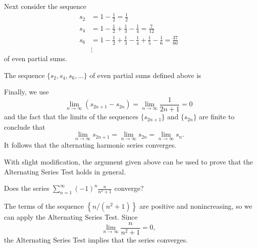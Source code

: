 \documentclass{ximera}
\begin{document}

Next consider the sequence
\begin{align*}
s_2 &= 1 - \frac{1}{2} = \frac{1}{2} \\
s_4 &= 1- \frac{1}{2} + \frac{1}{3} - \frac{1}{4} = \frac{7}{12} \\
s_6 &= 1 - \frac{1}{2} + \frac{1}{3} - \frac{1}{4} + \frac{1}{5} - \frac{1}{6} = \frac{37}{60} \\
&\vdots
\end{align*}
of even partial sums.

\begin{question}
The sequence $\{s_2,s_4,s_6,\ldots\}$ of even partial sums defined above is 
\begin{prompt}
        \begin{multipleChoice}
        \end{multipleChoice}
 \end{prompt}
 \end{question}
 
Finally, we use
$$
\lim_{n \rightarrow \infty} \left(s_{2n+1} - s_{2n} \right) = \lim_{n \rightarrow \infty} \frac{1}{2n+1} = 0
$$
and the fact that the limits of the sequences $\{s_{2n+1}\}$ and $\{s_{2n}\}$ are finite to conclude that
$$
\lim_{n \rightarrow \infty} s_{2n+1} = \lim_{n \rightarrow \infty} s_{2n} = \lim_{n\rightarrow \infty} s_n.
$$
It follows that the alternating harmonic series converges. 

With slight modification, the argument given above can be used to prove that the Alternating Series Test holds in general.


\begin{example}
Does the series $\sum_{n=1}^\infty (-1)^n\frac{n}{n^2+1}$ converge?

The terms of the sequence $\left\{n/(n^2+1)\right\}$ are positive and nonincreasing, so we can apply the Alternating Series Test. Since
$$
\lim_{n \rightarrow \infty} \frac{n}{n^2+1} = 0,
$$
the Alternating Series Test implies that the series converges.
\end{example}
\end{document}
